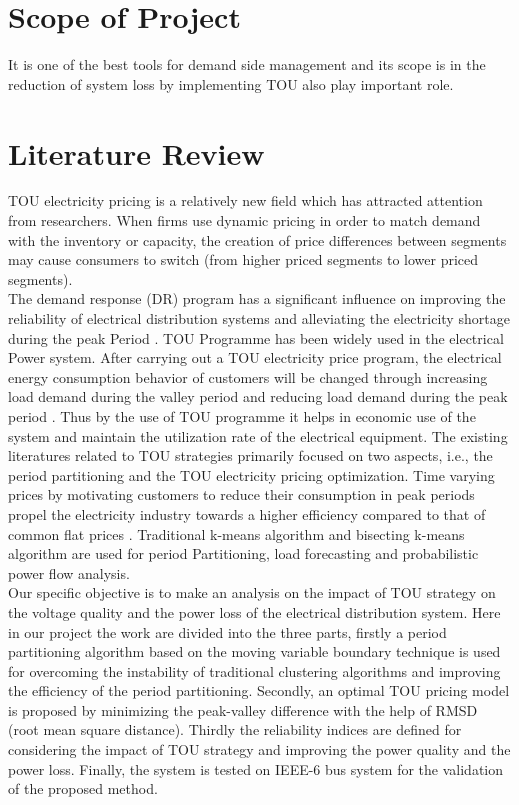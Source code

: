 \documentclass[12pt]{article}
\begin{document}
\section{Scope of Project}
It is one of the best tools for demand side management and its scope is in the
reduction of system loss by implementing TOU also play important role.
\pagebreak
\section{Literature Review}
TOU electricity pricing is a relatively new field which has attracted attention from
researchers. When firms use dynamic pricing in order to match demand with the
inventory or capacity, the creation of price differences between segments may
cause consumers to switch (from higher priced segments to lower priced segments).\\

The demand response (DR) program has a significant influence on improving
the reliability of electrical distribution systems and alleviating the electricity shortage during the peak Period \cite{yang2012game}
\cite{sheen1994time}
\cite{zhou2017multiobjective}
\cite{zeng2018hybrid} . TOU Programme has been widely used
in the electrical Power system. After carrying out a TOU electricity price program,
the electrical energy consumption behavior of customers will be changed through
increasing load demand during the valley period and reducing load demand during
the peak period \cite{li2014development}
\cite{celebi2012time} . Thus by the use of TOU programme it helps in economic
use of the system and maintain the utilization rate of the electrical equipment. The
existing literatures related to TOU strategies primarily focused on two aspects,
i.e., the period partitioning and the TOU electricity pricing optimization. Time
varying prices by motivating customers to reduce their consumption in peak periods propel the electricity industry towards a higher efficiency compared to that of
common flat prices \cite{safdarian2014medium}. Traditional k-means algorithm \cite{ren2017probabilistic} and bisecting k-means
algorithm \cite{liu2008kernel} are used for period Partitioning, load forecasting and probabilistic
power flow analysis.\\

Our specific objective is to make an analysis on the impact of TOU strategy on
the voltage quality and the power loss of the electrical distribution system. Here in
our project the work are divided into the three parts, firstly a period partitioning algorithm based on the moving variable boundary technique is used for overcoming
the instability of traditional clustering algorithms and improving the efficiency of
the period partitioning. Secondly, an optimal TOU pricing model is proposed by
minimizing the peak-valley difference with the help of RMSD (root mean square
distance). Thirdly the reliability indices are defined for considering the impact of
TOU strategy and improving the power quality and the power loss. Finally, the
system is tested on IEEE-6 bus system for the validation of the proposed method.\\
\end{document}
